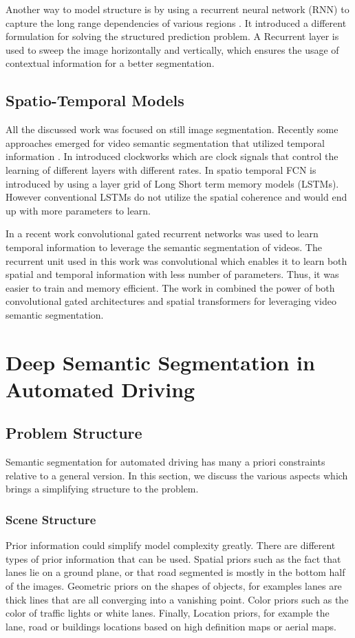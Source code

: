 \documentclass[conference]{IEEEtran}
\begin{document}
Another way to model structure is by using a recurrent neural network (RNN) to capture the long range dependencies of various regions \cite{visin2016reseg}. It introduced a different formulation for solving the structured prediction problem. A Recurrent layer is used to sweep the image horizontally and vertically, which ensures the usage of contextual information for a better segmentation.

\subsection{Spatio-Temporal Models}
All the discussed work was focused on still image segmentation. Recently some approaches emerged for video semantic segmentation that utilized temporal information \cite{ShelhamerRHD16}\cite{FayyazSSFK16}\cite{siam2016convolutional}\cite{nilsson2016semantic}. In \cite{ShelhamerRHD16} introduced clockworks which are clock signals that control the learning of different layers with different rates. In \cite{FayyazSSFK16} spatio temporal FCN is introduced by using a layer grid of Long Short term memory models (LSTMs). However conventional LSTMs do not utilize the spatial coherence and would end up with more parameters to learn. 

In a recent work \cite{siam2016convolutional} convolutional gated recurrent networks was used to learn temporal information to leverage the semantic segmentation of videos. The recurrent unit used in this work was convolutional which enables it to learn both spatial and temporal information with less number of parameters. Thus, it was easier to train and memory efficient. The work in \cite{nilsson2016semantic} combined the power of both convolutional gated architectures and spatial transformers for leveraging video semantic segmentation.


\section{Deep Semantic Segmentation in Automated Driving} \label{sec:drive}
\subsection{Problem Structure}
Semantic segmentation for automated driving has many a priori constraints relative to a general version. In this section, we discuss the various aspects which brings a simplifying structure to the problem.

\subsubsection{Scene Structure}
Prior information could simplify model complexity greatly. There are different types of prior information that can be used. Spatial priors such as the fact that lanes lie on a ground plane, or that road segmented is mostly in the bottom half of the images. Geometric priors on the shapes of objects, for examples lanes are thick lines that are all converging into a vanishing point. Color priors such as the color of traffic lights or white lanes. Finally, Location priors, for example the lane, road or buildings locations based on high definition maps or aerial maps.
\end{document}
